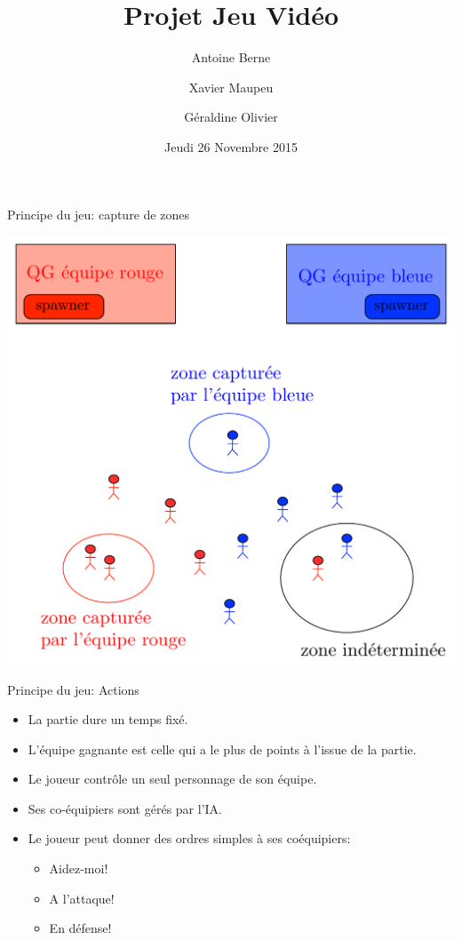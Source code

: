 \documentclass[10pt]{beamer}
\title[JV 2015] %
{Projet Jeu Vid\'eo}
\author[A. Berne, X. Mapeu, G. Olivier] %
{Antoine Berne \and Xavier Maupeu 
\and G\'eraldine Olivier
\medskip
}
\date[Novembre 2012] %
{Jeudi 26 Novembre 2015}
\begin{document}
\begin{frame}[plain]
  \titlepage
  
\end{frame}




\begin{frame}{Principe du jeu: capture de zones}

\begin{center}
\includegraphics[width=0.75\linewidth]{./zones.pdf}
\end{center}
\end{frame}



\begin{frame}{Principe du jeu: Actions}

\begin{itemize}
\item La partie dure un temps fix\'e. 

\medskip


\item L'\'equipe gagnante est celle qui a le plus de points \`a l'issue de la partie.

\medskip


\item Le joueur contr\^ole un seul personnage de son \'equipe.

\medskip


\item Ses co-\'equipiers sont g\'er\'es par l'IA.

\medskip

\item Le joueur peut donner des ordres simples \`a ses co\'equipiers:
\begin{itemize}
\item Aidez-moi!
\item A l'attaque!
\item En d\'efense!
\end{itemize}

\end{itemize}

\end{frame}
\end{document}
